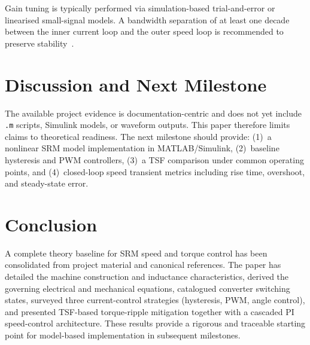 \documentclass[conference]{IEEEtran}
\begin{document}
Gain tuning is typically performed via simulation-based trial-and-error or linearised
small-signal models. A bandwidth separation of at least one decade between the inner current
loop and the outer speed loop is recommended to preserve stability~\cite{Ilic1987,Krishnan2001}.

\section{Discussion and Next Milestone}
The available project evidence is documentation-centric and does not yet include \texttt{.m}
scripts, Simulink models, or waveform outputs. This paper therefore limits claims to
theoretical readiness. The next milestone should provide: (1)~a nonlinear SRM model
implementation in MATLAB/Simulink, (2)~baseline hysteresis and PWM controllers, (3)~a TSF
comparison under common operating points, and (4)~closed-loop speed transient metrics
including rise time, overshoot, and steady-state error.

\section{Conclusion}
A complete theory baseline for SRM speed and torque control has been consolidated from project
material and canonical references. The paper has detailed the machine construction and
inductance characteristics, derived the governing electrical and mechanical equations,
catalogued converter switching states, surveyed three current-control strategies (hysteresis,
PWM, angle control), and presented TSF-based torque-ripple mitigation together with a cascaded
PI speed-control architecture. These results provide a rigorous and traceable starting point for
model-based implementation in subsequent milestones.



\end{document}
